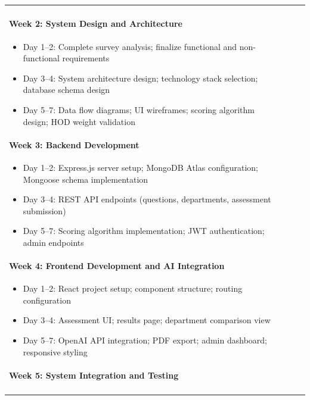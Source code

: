 \documentclass[12pt, a4paper]{article}
\begin{document}
\begin{itemize}[leftmargin=1.5em, itemsep=3pt]
\begin{table}[H]
\begin{tabularx}{\textwidth}{>{\raggedright\arraybackslash}p{0.8cm}>{\raggedright\arraybackslash}p{3.5cm}>{\raggedright\arraybackslash}X>{\raggedright\arraybackslash}p{2.5cm}}
\paragraph{Week 2: System Design and Architecture}

\begin{itemize}[leftmargin=1.5em, itemsep=2pt]
    \item Day 1--2: Complete survey analysis; finalize functional and non-functional requirements
    \item Day 3--4: System architecture design; technology stack selection; database schema design
    \item Day 5--7: Data flow diagrams; UI wireframes; scoring algorithm design; HOD weight validation
\end{itemize}

\paragraph{Week 3: Backend Development}

\begin{itemize}[leftmargin=1.5em, itemsep=2pt]
    \item Day 1--2: Express.js server setup; MongoDB Atlas configuration; Mongoose schema implementation
    \item Day 3--4: REST API endpoints (questions, departments, assessment submission)
    \item Day 5--7: Scoring algorithm implementation; JWT authentication; admin endpoints
\end{itemize}

\paragraph{Week 4: Frontend Development and AI Integration}

\begin{itemize}[leftmargin=1.5em, itemsep=2pt]
    \item Day 1--2: React project setup; component structure; routing configuration
    \item Day 3--4: Assessment UI; results page; department comparison view
    \item Day 5--7: OpenAI API integration; PDF export; admin dashboard; responsive styling
\end{itemize}

\paragraph{Week 5: System Integration and Testing}


\end{tabularx}
\end{table}
\end{itemize}
\end{document}
